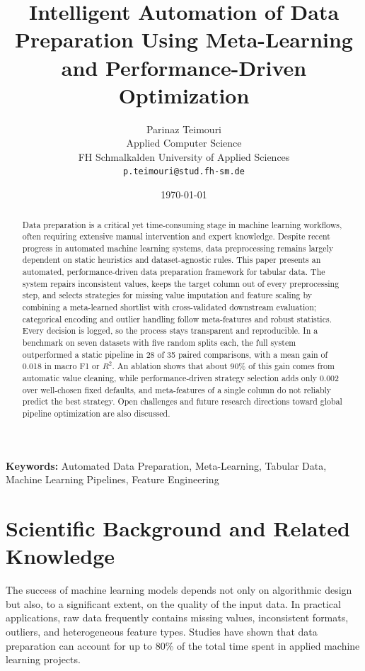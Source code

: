 \documentclass[11pt,a4paper]{article}
\title{\textbf{Intelligent Automation of Data Preparation Using Meta-Learning and Performance-Driven Optimization}}
\author{
    Parinaz Teimouri \\
    Applied Computer Science \\
    FH Schmalkalden University of Applied Sciences \\
    \texttt{p.teimouri@stud.fh-sm.de}
}
\date{\today}
\begin{document}
\maketitle

\begin{abstract}
Data preparation is a critical yet time-consuming stage in machine learning workflows, often requiring extensive manual intervention and expert knowledge. Despite recent progress in automated machine learning systems, data preprocessing remains largely dependent on static heuristics and dataset-agnostic rules. This paper presents an automated, performance-driven data preparation framework for tabular data. The system repairs inconsistent values, keeps the target column out of every preprocessing step, and selects strategies for missing value imputation and feature scaling by combining a meta-learned shortlist with cross-validated downstream evaluation; categorical encoding and outlier handling follow meta-features and robust statistics. Every decision is logged, so the process stays transparent and reproducible. In a benchmark on seven datasets with five random splits each, the full system outperformed a static pipeline in 28 of 35 paired comparisons, with a mean gain of 0.018 in macro F1 or $R^2$. An ablation shows that about 90\% of this gain comes from automatic value cleaning, while performance-driven strategy selection adds only 0.002 over well-chosen fixed defaults, and meta-features of a single column do not reliably predict the best strategy. Open challenges and future research directions toward global pipeline optimization are also discussed.
\end{abstract}

\noindent\textbf{Keywords:} Automated Data Preparation, Meta-Learning, Tabular Data, Machine Learning Pipelines, Feature Engineering


\section{Scientific Background and Related Knowledge}

The success of machine learning models depends not only on algorithmic design but also, to a significant extent, on the quality of the input data. In practical applications, raw data frequently contains missing values, inconsistent formats, outliers, and heterogeneous feature types. Studies have shown that data preparation can account for up to 80\% of the total time spent in applied machine learning projects.
\end{document}
